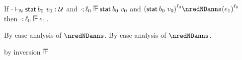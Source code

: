 \begin{lemma}\label{H-sta-label-preservation}
  If\/ $\snil \sWTN \estab{\sbnd_0}{\svalue_0} : \tdyn$
  and\/ $\snil; \sowner_0 \sWSOP \estab{\sbnd_0}{\svalue_0}$
  and\/ $\obars{\estab{\sbnd_0}{\svalue_0}}{\sowner_0} \nredNDanns \obars{\sexpr_1}{\sowner_0}$
  then\/ $\snil; \sowner_0 \sWSOP \sexpr_1$.
\end{lemma}{
  \newcommand{\shortproof}{By case analysis of $\nredNDanns$.}
\begin{lamportproof*}
  \shortproof
\mainproof
  \shortproof

    \begin{pfproof}
      by inversion $\sWSOP$
    \end{pfproof}

    \begin{pfproof}
      \qedstep
        \begin{pfproof}
          \begin{mathpar}
          \end{mathpar}
        \end{pfproof}
    \end{pfproof}


\end{lamportproof*}}
